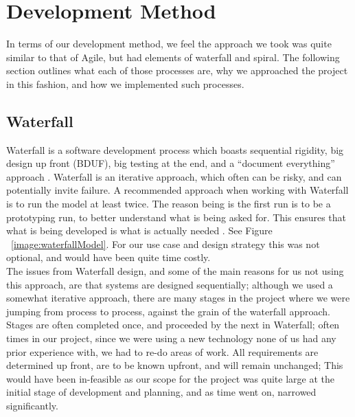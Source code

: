 \section{Development Method}
In terms of our development method, we feel the approach we took was quite similar to that of Agile, but had elements of waterfall and spiral. The following section outlines what each of those processes are, why we approached the project in this fashion, and how we implemented such processes.
\subsection{Waterfall}
Waterfall is a software development process which boasts sequential rigidity, big design up front (BDUF), big testing at the end, and a “document everything” approach \cite{palmquist2013parallel}. Waterfall is an iterative approach, which often can be risky, and can potentially invite failure. A recommended approach when working with Waterfall is to run the model at least twice. The reason being is the first run is to be a prototyping run, to better understand what is being asked for. This ensures that what is being developed is what is actually needed \cite{palmquist2013parallel}. See Figure ~\ref{image:waterfallModel}. For our use case and design strategy this was not optional, and would have been quite time costly.
\\ The issues from Waterfall design, and some of the main reasons for us not using this approach, are that systems are designed sequentially; although we used a somewhat iterative approach, there are many stages in the project where we were jumping from process to process, against the grain of the waterfall approach. Stages are often completed once, and proceeded by the next in Waterfall; often times in our project, since we were using a new technology none of us had any prior experience with, we had to re-do areas of work. All requirements are determined up front, are to be known upfront, and will remain unchanged; This would have been in-feasible as our scope for the project was quite large at the initial stage of development and planning, and as time went on, narrowed significantly. 


